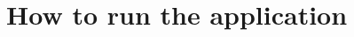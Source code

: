 \documentclass[../aa_main.tex]{subfiles}
\begin{document}
\appendix

\chapter{How to run the application}

\end{document}
